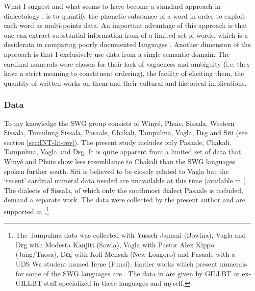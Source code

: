 What I suggest and what seems to have become  a standard approach in
dialectology \citep{Nerb07}, is to quantify  the phonetic substance of a word in
order to exploit each word as multi-points data. An important advantage of this
approach is that one can extract substantial information from of a limited set
of words, which is a desiderata in comparing poorly documented languages
\citep{Hegg05}.  Another dimension of the approach is that I exclusively use 
data  from a single semantic domain.  The cardinal numerals were chosen for
their lack of vagueness and ambiguity (i.e. they have a strict meaning to
constituent ordering), the facility of eliciting them, the quantity of  written
works on them and their cultural and historical implications.

\subsubsection{Data}
\label{sec:NUM-data}

To my knowledge the SWG group
consists
of  Winyé, Phuie, Sissala, Western Sissala, Tumulung
Sissala, Pasaale, Chakali, Tampulma, Vagla, Dɛg and Siti  (see section
\ref{sec:INT-lit-rev}). The present
study includes only Pasaale, Chakali, Tampulma, Vagla and  Dɛg. It is quite
apparent from a limited set of data that Winyé and Phuie
show less resemblance to Chakali than the SWG languages spoken further south.
Siti is
believed to
be closely related to Vagla \citep{Klei99b} but the `recent' cardinal numeral
data needed are unavailable  at this time (available in \cite{Dela04}). The
dialects of Sissala, of which only the southmost
dialect Pasaale is included, demand a separate work. The data were collected by
the present author and are supported in
\cite{Chan09}.\footnote{\label{fot:data-orig} The Tampulma data was collected
with Yusseh
Jamani (Bowina),  Vagla   and  Dɛg with  Modesta Kanjiti (Sawla),  Vagla with
Pastor Alex Kippo  (Jang/Tuosa),  Dɛg with Kofi Mensah (New Longoro) and 
Pasaale with a UDS Wa student named Irene  (Funsi).  Earlier works which
present numerals for some of the
SWG
languages  are  \cite{Dela04, Taux21, Ratt32b, Good54}.  The data in
\cite{Chan09} are given by GILLBT or ex-GILLBT staff specialized in these
languages and myself.}

